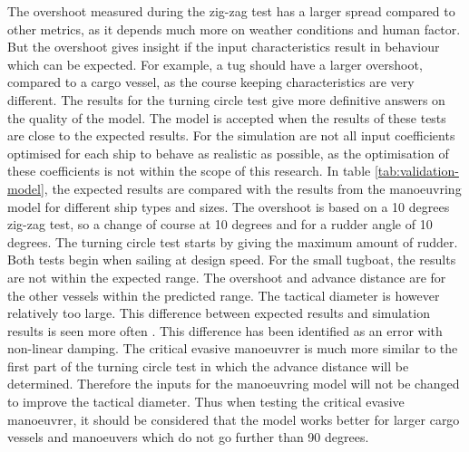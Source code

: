 The overshoot measured during the zig-zag test has a larger spread compared to other metrics, as it depends much more on weather conditions and human factor. But the overshoot gives insight if the input characteristics result in behaviour which can be expected. For example, a tug should have a larger overshoot, compared to a cargo vessel, as the course keeping characteristics are very different. The results for the turning circle test give more definitive answers on the quality of the model. The model is accepted when the results of these tests are close to the expected results. For the simulation are not all input coefficients optimised for each ship to behave as realistic as possible, as the optimisation of these coefficients is not within the scope of this research. In table \ref{tab:validation-model}, the expected results are compared with the results from the manoeuvring model for different ship types and sizes. The overshoot is based on a 10 degrees zig-zag test, so a change of course at 10 degrees and for a rudder angle of 10 degrees. The turning circle test starts by giving the maximum amount of rudder. Both tests begin when sailing at design speed. For the small tugboat, the results are not within the expected range. The overshoot and advance distance are for the other vessels within the predicted range. The tactical diameter is however relatively too large. This difference between expected results and simulation results is seen more often \cite{Tjoswold2012}. This difference has been identified as an error with non-linear damping. The critical evasive manoeuvrer is much more similar to the first part of the turning circle test in which the advance distance will be determined. Therefore the inputs for the manoeuvring model will not be changed to improve the tactical diameter. 
Thus when testing the critical evasive manoeuvrer, it should be considered that the model works better for larger cargo vessels and manoeuvers which do not go further than 90 degrees.

